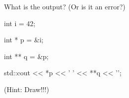 What is the output? (Or is it an error?)



\begin{consolethree}[escapeinside=||]

int i = 42;

int * p = &i;

int ** q = &p;



std::cout << *p << ' ' << **q << '\n'; 

\end{consolethree}

(Hint: Draw!!!)

